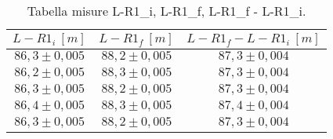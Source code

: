 \begin{table}[H]
    \centering
        \begin{tabular}{|c|c|c|}
        \hline
        $ L-R1_i~[m] $ & $ L-R1_f~[m] $ & $ L-R1_f - L-R1_i~[m] $\\
        \hline
        $ 86,3 \pm 0,005 $ & $ 88,2 \pm 0,005 $ & $ 87,3 \pm 0,004 $\\
        \hline
        $ 86,2 \pm 0,005 $ & $ 88,3 \pm 0,005 $ & $ 87,3 \pm 0,004 $\\
        \hline
        $ 86,3 \pm 0,005 $ & $ 88,2 \pm 0,005 $ & $ 87,3 \pm 0,004 $\\
        \hline
        $ 86,4 \pm 0,005 $ & $ 88,3 \pm 0,005 $ & $ 87,4 \pm 0,004 $\\
        \hline
        $ 86,3 \pm 0,005 $ & $ 88,2 \pm 0,005 $ & $ 87,3 \pm 0,004 $\\
        \hline
        \end{tabular}
    \caption{Tabella misure L-R1_i, L-R1_f, L-R1_f - L-R1_i.}
\end{table}